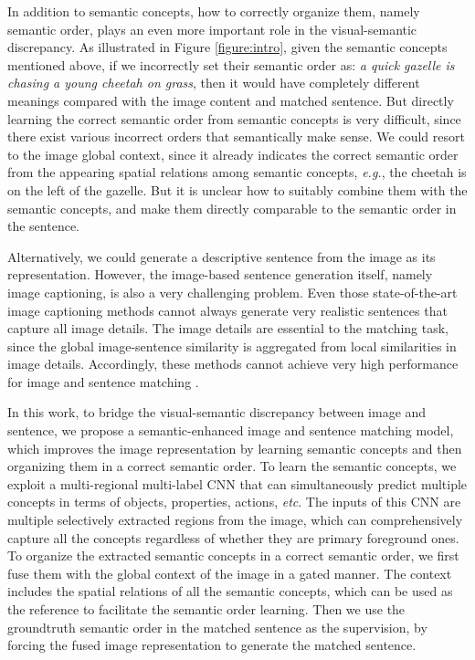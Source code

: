 \documentclass[10pt,twocolumn,letterpaper]{article}
\begin{document}
In addition to semantic concepts,
how to correctly organize them, namely semantic order, plays an even more
important role in the visual-semantic discrepancy.
As illustrated in Figure \ref{figure:intro}, given the semantic concepts mentioned above,
if we incorrectly set their semantic order as:
\emph{a quick gazelle is chasing a young cheetah on grass},
then it would have completely different meanings
compared with the image content and matched sentence.
But directly learning the correct semantic order from semantic concepts is very difficult,
since there exist various incorrect orders that semantically make sense.
We could resort to the image global context, since it already indicates the correct semantic order
from the appearing spatial relations among semantic concepts,
\emph{e.g.}, the cheetah is on the left of the gazelle.
But it is unclear how to suitably combine them with the semantic concepts,
and make them directly comparable to the semantic order in the sentence.



Alternatively, we could generate a descriptive sentence from the image
as its representation.
However, the image-based sentence generation itself,
namely image captioning, is also a very challenging problem.
Even those state-of-the-art image captioning methods
cannot always generate very realistic sentences that capture all image details.
The image details are essential to the matching task,
since the global image-sentence similarity is aggregated from local similarities in image details.
Accordingly, these methods cannot achieve very high performance
for image and sentence matching \cite{vinyals2017show,donahue2015long}.



In this work, to bridge the visual-semantic discrepancy between image and sentence,
we propose a semantic-enhanced image and sentence matching model,
which improves the image representation by learning semantic concepts
and then organizing them in a correct semantic order.
To learn the semantic concepts,
we exploit a multi-regional multi-label CNN that can simultaneously
predict multiple concepts in terms of objects, properties, actions, \emph{etc}.
The inputs of this CNN are multiple selectively extracted regions from the image,
which can comprehensively capture all the concepts regardless of whether they are primary foreground ones.
To organize the extracted semantic concepts in a correct semantic order,
we first fuse them with the global context of the image in a gated manner.
The context includes the spatial relations of all the semantic concepts,
which can be used as the reference to facilitate the semantic order learning.
Then we use the groundtruth semantic order in the matched sentence as
the supervision, by forcing the fused image representation to generate the matched sentence.
\end{document}

